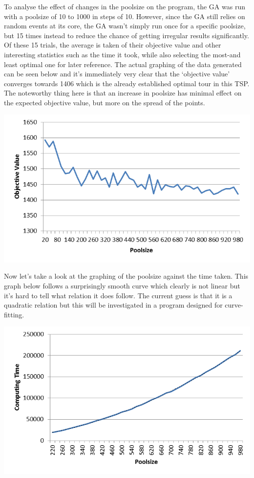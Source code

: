 \par
To analyse the effect of changes in the poolsize on the program, the GA was run with a poolsize of 10 to 1000 in steps of 10. However, since the GA still relies on random events at its core, the GA wasn’t simply run once for a specific poolsize, but 15 times instead to reduce the chance of getting irregular results significantly. Of these 15 trials, the average is taken of their objective value and other interesting statistics such as the time it took, while also selecting the most-and least optimal one for later reference.
The actual graphing of the data generated can be seen below and it’s immediately very clear that the ‘objective value’ converges towards 1406 which is the already established optimal tour in this TSP. The noteworthy thing here is that an increase in poolsize has minimal effect on the expected objective value, but more on the spread of the points.

	\includegraphics[height=8cm]{OVP}

\par
Now let’s take a look at the graphing of the poolsize against the time taken. 
This graph below follows a surprisingly smooth curve which clearly is not linear but it’s hard to tell what relation it does follow. The current guess is that it is a quadratic relation but this will be investigated in a program designed for curve-fitting.

	\includegraphics[height=8cm]{CTP}



